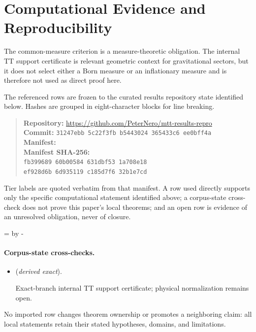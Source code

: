 \documentclass[11pt]{article}
\begin{document}
\section*{Computational Evidence and Reproducibility}
The common-measure criterion is a measure-theoretic obligation. The internal TT support certificate is relevant geometric context for gravitational sectors, but it does not select either a Born measure or an inflationary measure and is therefore not used as direct proof here.

The referenced rows are frozen to the curated results repository state identified below. Hashes are grouped in eight-character blocks for line breaking.
\begin{quote}\small
\textbf{Repository:} \url{https://github.com/PeterNero/mtt-results-repro}\\
\textbf{Commit:} \texttt{31247ebb 5c22f3fb b5443024 365433c6 ee0bff4a}\\
\textbf{Manifest:} \\
\textbf{Manifest SHA-256:}\\
\texttt{fb399689 60b00584 631dbf53 1a708e18}\\
\texttt{ef928d6b 6d935119 c185d7f6 32b1e7cd}
\end{quote}

Tier labels are quoted verbatim from that manifest. A row used directly supports only the specific computational statement identified above; a corpus-state cross-check does not prove this paper's local theorems; and an open row is evidence of an unresolved obligation, never of closure.

\par\begingroup{}=\pagegoal\advance{} by -\pagetotal\ifdim\dimen0<7\baselineskip\newpage\fi\endgroup
\paragraph{Corpus-state cross-checks.}
\begin{itemize}
\setlength{\itemsep}{0.25em}
\item {} (\emph{derived exact}).\par Exact-branch internal TT support certificate; physical normalization remains open.
\end{itemize}

No imported row changes theorem ownership or promotes a neighboring claim: all local statements retain their stated hypotheses, domains, and limitations.
\end{document}
